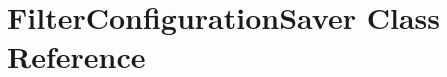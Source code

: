 \hypertarget{classUtility_1_1FilterConfigurationSaver}{}\section{Filter\+Configuration\+Saver Class Reference}
\label{classUtility_1_1FilterConfigurationSaver}

